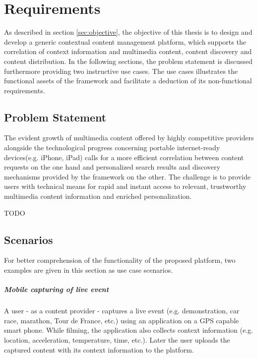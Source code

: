 \chapter{Requirements\label{cha:chapter3}}
As described in section \ref{sec:objective}, the objective of this thesis is to design and develop a generic contextual content management platform, which supports the correlation of context information and multimedia content, content discovery and content distribution. In the following sections, the problem statement is discussed furthermore providing two instructive use cases. The use cases illustrates the functional assets of the framework and facilitate a deduction of its non-functional requirements.
 
\section{Problem Statement\label{sec:req_pro_st}}

The evident growth of multimedia content offered by highly competitive  providers alongside the technological progress concerning portable internet-ready devices(e.g. iPhone, iPad) calls for a more efficient correlation between content requests on the one hand and personalized search results and discovery mechanisms provided by the framework on the other.
The challenge is to provide users with technical means for rapid and instant access to relevant, trustworthy multimedia content information and enriched personalization.
 
 TODO
 
\section{Scenarios\label{sec:req_sce}}

For better comprehension of the functionality of the proposed platform, two examples are given in this section as use case scenarios.

\paragraph{Mobile capturing of live event}

A user - as a content provider - captures a live event (e.g. demonstration, car race, marathon, Tour de France, etc.) using an application on a GPS capable smart phone. While filming, the application also collects context information (e.g. location, acceleration, temperature, time, etc.). Later the user uploads the captured content with its context information to the platform.

